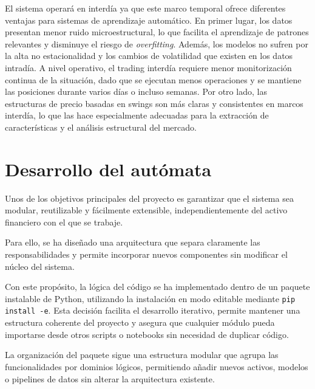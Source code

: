 El sistema operará en interdía ya que este marco temporal ofrece diferentes ventajas para sistemas de aprendizaje automático. En primer lugar, los
datos presentan menor ruido microestructural, lo que facilita el aprendizaje de patrones relevantes y disminuye el riesgo de \textit{overfitting}.
Además, los modelos no sufren por la alta no estacionalidad y los cambios de volatilidad que existen en los datos intradía. A nivel operativo, el
trading interdía requiere menor monitorización continua de la situación, dado que se ejecutan menos operaciones y se mantiene las posiciones durante
varios días o incluso semanas. Por otro lado, las estructuras de precio basadas en swings son más claras y consistentes en marcos interdía, lo que las
hace especialmente adecuadas para la extracción de características y el análisis estructural del mercado.

\section{Desarrollo del autómata}

Unos de los objetivos principales del proyecto es garantizar que el sistema sea modular, reutilizable y fácilmente extensible, independientemente del
activo financiero con el que se trabaje.

Para ello, se ha diseñado una arquitectura que separa claramente las responsabilidades y permite incorporar nuevos componentes sin modificar el núcleo
del sistema.

Con este propósito, la lógica del código se ha implementado dentro de un paquete instalable de Python, utilizando la instalación en modo editable
mediante \texttt{pip install -e}. Esta decisión facilita el desarrollo iterativo, permite mantener una estructura coherente del proyecto y
asegura que cualquier módulo pueda importarse desde otros scripts o notebooks sin necesidad de duplicar código.

La organización del paquete sigue una estructura modular que agrupa las funcionalidades por dominios lógicos, permitiendo añadir nuevos activos,
modelos o pipelines de datos sin alterar la arquitectura existente.


